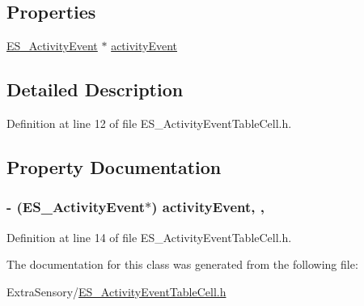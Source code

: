 \subsection*{Properties}
\begin{DoxyCompactItemize}
\item 
\hyperlink{interface_e_s___activity_event}{E\+S\+\_\+\+Activity\+Event} $\ast$ \hyperlink{interface_e_s___activity_event_table_cell_a62b724d59c9e693b36f6adce05d34189}{activity\+Event}
\end{DoxyCompactItemize}


\subsection{Detailed Description}


Definition at line 12 of file E\+S\+\_\+\+Activity\+Event\+Table\+Cell.\+h.



\subsection{Property Documentation}
\hypertarget{interface_e_s___activity_event_table_cell_a62b724d59c9e693b36f6adce05d34189}{
\subsubsection[{activity\+Event}]{\setlength{\rightskip}{0pt plus 5cm}-\/ ({\bf E\+S\+\_\+\+Activity\+Event}$\ast$) activity\+Event\hspace{0.3cm}{\ttfamily [read]}, {\ttfamily [write]}, {\ttfamily [atomic]}}}\label{interface_e_s___activity_event_table_cell_a62b724d59c9e693b36f6adce05d34189}


Definition at line 14 of file E\+S\+\_\+\+Activity\+Event\+Table\+Cell.\+h.



The documentation for this class was generated from the following file\+:\begin{DoxyCompactItemize}
\item 
Extra\+Sensory/\hyperlink{_e_s___activity_event_table_cell_8h}{E\+S\+\_\+\+Activity\+Event\+Table\+Cell.\+h}\end{DoxyCompactItemize}
